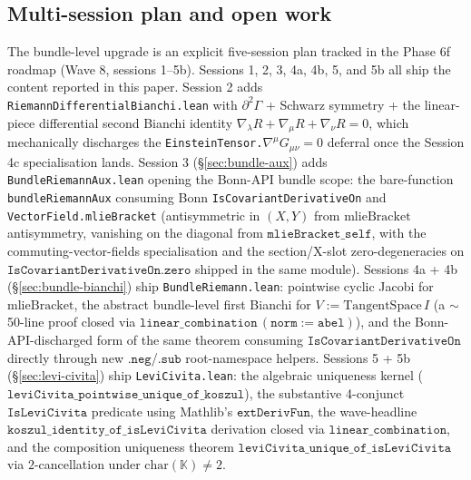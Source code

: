 \documentclass[twocolumn]{revtex4-2}
\newcommand{\Christoffel}{\Gamma}
\newcommand{\Riem}{R}
\begin{document}
\subsection{Multi-session plan and open work}
The bundle-level upgrade is an explicit five-session plan tracked
in the Phase 6f roadmap (Wave 8, sessions 1--5b). Sessions 1, 2, 3,
4a, 4b, 5, and 5b all ship the content reported in this paper.
Session 2 adds \texttt{RiemannDifferentialBianchi.lean} with
$\partial^{2}\Christoffel$ + Schwarz symmetry + the linear-piece
differential second Bianchi identity
$\nabla_{\lambda}\Riem + \nabla_{\mu}\Riem + \nabla_{\nu}\Riem = 0$,
which mechanically discharges the
\texttt{EinsteinTensor.}$\nabla^{\mu}G_{\mu\nu} = 0$ deferral once the
Session 4c specialisation lands.
Session 3 (\S\ref{sec:bundle-aux}) adds \texttt{BundleRiemannAux.lean}
opening the Bonn-API bundle scope: the bare-function
\texttt{bundleRiemannAux} consuming Bonn
\texttt{IsCovariantDerivativeOn} and \texttt{VectorField.mlieBracket}
(antisymmetric in $(X,Y)$ from $\mathrm{mlieBracket}$ antisymmetry,
vanishing on the diagonal from $\mathtt{mlieBracket\_self}$, with the
commuting-vector-fields specialisation and the section/X-slot
zero-degeneracies on $\texttt{IsCovariantDerivativeOn.zero}$ shipped
in the same module).
Sessions 4a + 4b (\S\ref{sec:bundle-bianchi}) ship
\texttt{BundleRiemann.lean}: pointwise cyclic Jacobi for
$\mathrm{mlieBracket}$, the abstract bundle-level first Bianchi for
$V := \mathrm{TangentSpace}\,I$ (a $\sim$50-line proof closed via
$\texttt{linear\_combination}\,(\texttt{norm} := \texttt{abel})$), and
the Bonn-API-discharged form of the same theorem consuming
$\texttt{IsCovariantDerivativeOn}$ directly through new
$\texttt{.neg}$/$\texttt{.sub}$ root-namespace helpers.
Sessions 5 + 5b (\S\ref{sec:levi-civita}) ship
\texttt{LeviCivita.lean}: the algebraic uniqueness kernel
($\texttt{leviCivita\_pointwise\_unique\_of\_koszul}$), the
substantive 4-conjunct $\texttt{IsLeviCivita}$ predicate using
Mathlib's $\texttt{extDerivFun}$, the wave-headline
$\texttt{koszul\_identity\_of\_isLeviCivita}$ derivation closed via
$\texttt{linear\_combination}$, and the composition uniqueness
theorem $\texttt{leviCivita\_unique\_of\_isLeviCivita}$ via
$2$-cancellation under $\mathrm{char}(\mathbb{K}) \neq 2$.
\end{document}
